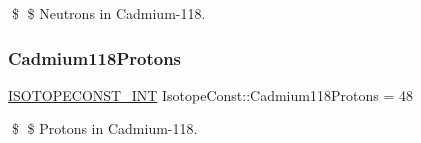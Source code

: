 \$ \$ Neutrons in Cadmium-\/118. \mbox{\label{group___isotope_const-_cadmium-_cd118_ga9e19378a5d8c93decc2a419f66896148}} 
\subsubsection{\texorpdfstring{Cadmium118\+Protons}{Cadmium118Protons}}
{\footnotesize\ttfamily \mbox{\hyperlink{group___isotope_const-_macros_ga5f18360b3e99483a35c32d789e62621c}{I\+S\+O\+T\+O\+P\+E\+C\+O\+N\+S\+T\+\_\+\+I\+NT}} Isotope\+Const\+::\+Cadmium118\+Protons = 48}

\$ \$ Protons in Cadmium-\/118. 